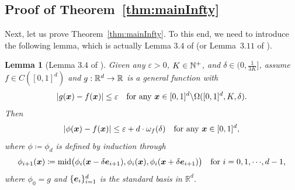\documentclass[nohyperref]{article}
\theoremstyle{plain}
\newtheorem{lemma}[theorem]{Lemma}
\theoremstyle{definition}
\theoremstyle{remark}
\begin{document}
\subsection{Proof of Theorem~\ref{thm:mainInfty}}
Next, let us prove Theorem~\ref{thm:mainInfty}. To this end, we need to introduce the following lemma, which is actually Lemma $3.4$ of \cite{shijun3} (or Lemma~$3.11$ of \cite{shijun:thesis}).
\begin{lemma}[Lemma $3.4$ of \cite{shijun3}]
	\label{lem:approx:trifling}
	Given any $\varepsilon>0$, $K\in \N^+$, and $\delta\in (0,\tfrac{1}{3K}]$,
	assume $f\in C([0,1]^d)$ and $g:\R^d\to\R$ is a general function with 
	\begin{equation*}
		|g({\bm{x}})-f({\bm{x}})|\le \varepsilon\quad \textnormal{for any ${\bm{x}}\in [0,1]^d\backslash \Omega([0,1]^d,K,\delta)$.}
	\end{equation*} 
	Then 
	\begin{equation*}
		|\phi({\bm{x}})-f({\bm{x}})|\le \varepsilon+d\cdot\omega_f(\delta)\quad \textnormal{for any ${\bm{x}}\in [0,1]^d$,}
	\end{equation*}
	where $\phi\coloneqq  \phi_d$ is defined by induction through
	\begin{equation*}
		\label{eq:phiInduction}
		\phi_{i+1}(\bmx)\coloneqq  \middleValue\big(\phi_{i}(\bmx-\delta\bme_{i+1}),\phi_{i}(\bmx),\phi_{i}(\bmx+\delta\bme_{i+1})\big)\quad \tn{for $i=0,1,\cdots,d-1$,}
	\end{equation*}
	where $\phi_0=g$ and $\{{\bm{e}}_i\}_{i=1}^d$ is the standard basis in $\mathbb{R}^d$. 	
\end{lemma}
\end{document}
